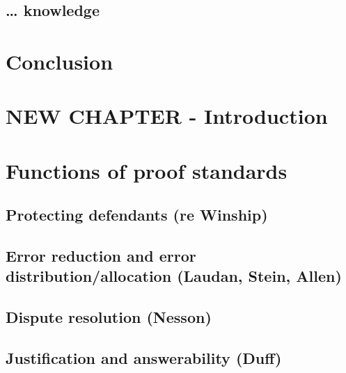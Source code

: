 \documentclass[10pt,dvipsnames]{scrartcl}
\begin{document}
\hypertarget{knowledge-1}{%
\subsection{\ldots{} knowledge}\label{knowledge-1}}

\hypertarget{conclusion}{%
\section{Conclusion}\label{conclusion}}

\hypertarget{new-chapter---introduction-1}{%
\section{NEW CHAPTER -
Introduction}\label{new-chapter---introduction-1}}

\hypertarget{functions-of-proof-standards}{%
\section{Functions of proof
standards}\label{functions-of-proof-standards}}

\hypertarget{protecting-defendants-re-winship}{%
\subsection{Protecting defendants (re
Winship)}\label{protecting-defendants-re-winship}}

\hypertarget{error-reduction-and-error-distributionallocation-laudan-stein-allen}{%
\subsection{Error reduction and error distribution/allocation (Laudan,
Stein,
Allen)}\label{error-reduction-and-error-distributionallocation-laudan-stein-allen}}

\hypertarget{dispute-resolution-nesson}{%
\subsection{Dispute resolution
(Nesson)}\label{dispute-resolution-nesson}}

\hypertarget{justification-and-answerability-duff}{%
\subsection{Justification and answerability
(Duff)}\label{justification-and-answerability-duff}}
\end{document}

